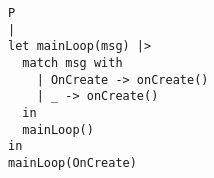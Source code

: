 \begin{verbatim}
P
|
let mainLoop(msg) |>
  match msg with
    | OnCreate -> onCreate()
    | _ -> onCreate()
  in
  mainLoop()
in
mainLoop(OnCreate)
\end{verbatim}
